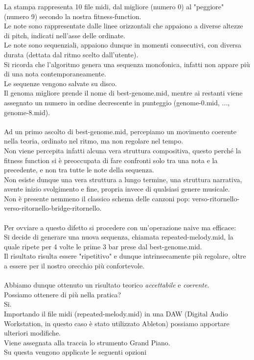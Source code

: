 \documentclass[a4paper,12pt]{report}
\begin{document}
La stampa rappresenta 10 file midi, dal migliore (numero 0) al "peggiore" (numero 9) secondo la nostra fitness-function. \\
Le note sono rappresentate dalle linee orizzontali che appaiono a diverse altezze di pitch, indicati nell'asse delle ordinate. \\
Le note sono sequenziali, appaiono dunque in momenti consecutivi, con diversa durata (dettata dal ritmo scelto dall'utente). \\
Si ricorda che l'algoritmo genera una sequenza monofonica, infatti non appare più di una nota contemporaneamente. \\
Le sequenze vengono salvate su disco. \\
Il genoma migliore prende il nome di best-genome.mid, mentre ai restanti viene assegnato un numero in ordine decrescente in punteggio (genome-0.mid, ..., genome-8.mid). \\
\\
Ad un primo ascolto di best-genome.mid, percepiamo un movimento coerente nella teoria, ordinato nel ritmo, ma non regolare nel tempo. \\
Non viene percepita infatti alcuna vera struttura compositiva, questo perché la fitness function si è preoccupata di fare confronti solo tra una nota e la precedente, e non tra tutte le note della sequenza. \\
Non esiste dunque una vera struttura a lungo termine, una struttura narrativa, avente inizio svolgimento e fine, propria invece di qualsiasi genere musicale. \\
Non è presente nemmeno il classico schema delle canzoni pop: verso-ritornello-verso-ritornello-bridge-ritornello. \\
\\
Per ovviare a questo difetto si procedere con un'operazione naive ma efficace: \\
Si decide di generare una nuova sequenza, chiamata repeated-melody.mid, la quale ripete per 4 volte le prime 3 bar prese dal best-genome.mid. \\
Il risultato risulta essere "ripetitivo" e dunque intrinsecamente più regolare, oltre a essere per il nostro orecchio più confortevole. \\
\\
Abbiamo dunque ottenuto un risultato teorico \textit{accettabile} e \textit{coerente}. \\
Possiamo ottenere di più nella pratica? \\
Si. \\
Importando il file midi (repeated-melody.mid) in una DAW (Digital Audio Workstation, in questo caso è stato utilizzato Ableton) possiamo apportare ulteriori modifiche. \\
Viene assegnata alla traccia lo strumento Grand Piano. \\
Su questa vengono applicate le seguenti opzioni
\end{document}
